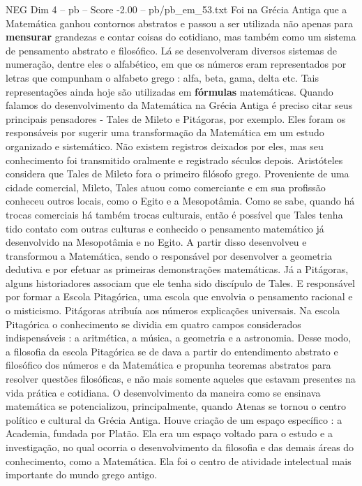 \begin{textsample}{NEG Dim 4 – pb – Score -2.00 – pb/pb\_em\_53.txt}
Foi na Grécia Antiga que a Matemática ganhou contornos abstratos e passou a ser utilizada não apenas para \textbf{mensurar} grandezas e contar coisas do cotidiano, mas também como um sistema de pensamento abstrato e filosófico.
Lá se desenvolveram diversos sistemas de numeração, dentre eles o alfabético, em que os números eram representados por letras que compunham o alfabeto grego : alfa, beta, gama, delta etc.
Tais representações ainda hoje são utilizadas em \textbf{fórmulas} matemáticas.
Quando falamos do desenvolvimento da Matemática na Grécia Antiga é preciso citar seus principais pensadores - Tales de Mileto e Pitágoras, por exemplo.
Eles foram os responsáveis por sugerir uma transformação da Matemática em um estudo organizado e sistemático.
Não existem registros deixados por eles, mas seu conhecimento foi transmitido oralmente e registrado séculos depois.
Aristóteles considera que Tales de Mileto fora o primeiro filósofo grego.
Proveniente de uma cidade comercial, Mileto, Tales atuou como comerciante e em sua profissão conheceu outros locais, como o Egito e a Mesopotâmia.
Como se sabe, quando há trocas comerciais há também trocas culturais, então é possível que Tales tenha tido contato com outras culturas e conhecido o pensamento matemático já desenvolvido na Mesopotâmia e no Egito.
A partir disso desenvolveu e transformou a Matemática, sendo o responsável por desenvolver a geometria dedutiva e por efetuar as primeiras demonstrações matemáticas.
Já a Pitágoras, alguns historiadores associam que ele tenha sido discípulo de Tales.
E responsável por formar a Escola Pitagórica, uma escola que envolvia o pensamento racional e o misticismo.
Pitágoras atribuía aos números explicações universais.
Na escola Pitagórica o conhecimento se dividia em quatro campos considerados indispensáveis : a aritmética, a música, a geometria e a astronomia.
Desse modo, a filosofia da escola Pitagórica se de dava a partir do entendimento abstrato e filosófico dos números e da Matemática e propunha teoremas abstratos para resolver questões filosóficas, e não mais somente aqueles que estavam presentes na vida prática e cotidiana.
O desenvolvimento da maneira como se ensinava matemática se potencializou, principalmente, quando Atenas se tornou o centro político e cultural da Grécia Antiga.
Houve criação de um espaço específico : a Academia, fundada por Platão.
Ela era um espaço voltado para o estudo e a investigação, no qual ocorria o desenvolvimento da filosofia e das demais áreas do conhecimento, como a Matemática.
Ela foi o centro de atividade intelectual mais importante do mundo grego antigo.

\end{textsample}
